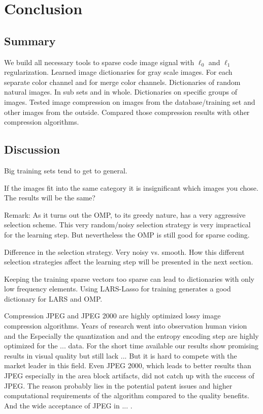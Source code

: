 \chapter{Conclusion}

\section{Summary} %

We build all necessary tools to sparse code image signal with $\ell_0$ and
$\ell_1$ regularization. Learned image dictionaries for gray scale images. For
each separate color channel and for merge color channels. Dictionaries of
random natural images. In sub sets and in whole. Dictionaries on specific
groups of images. Tested image compression on images from the
database/training set and other images from the outside. 
Compared those compression results with other compression algorithms.

\section{Discussion}

Big training sets tend to get to general.

If the images fit into the same category it is insignificant which images you
chose. The results will be the same?

Remark:
As it turns out the OMP, to its greedy nature, has a very aggressive selection
scheme. This very random/noisy selection strategy is very impractical
for the \trainDL learning step. But nevertheless the OMP is still good for
sparse coding. 

Difference in the selection strategy.
Very noisy vs. smooth. 
How this different selection strategies affect the learning step will be
presented in the next section.


Keeping the training sparse vectors too sparse can lead to dictionaries with
only low frequency elements. Using LARS-Lasso for training generates a good
dictionary for LARS and OMP. 


Compression 
JPEG and JPEG 2000 are highly optimized lossy image compression algorithms. 
Years of research went into observation human vision and the 
Especially the quantization and and the entropy encoding step are highly
optimized for the ... data.
For the short time available our results show promising results in visual
quality but still lack ...
But it is hard to compete with the market leader in this field.  Even JPEG 2000,
which leads to better results than JPEG especially in the area block artifacts,
did not catch up with the success of JPEG. 
The reason probably lies in the potential patent issues and higher computational
requirements of the algorithm compared
to the quality benefits. And the wide acceptance of JPEG in ...
.


